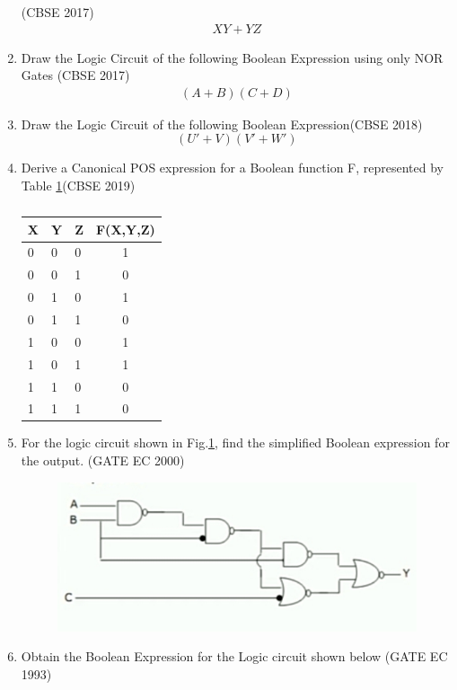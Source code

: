 \begin{enumerate}
\hfill (CBSE 2017)
\label{prob:2017-1/c/6/b}
\begin{align}
	\label{eq:2017-1/c/6/b}
	XY + YZ
\end{align}
\item Draw the Logic Circuit of the following Boolean Expression using only NOR Gates
\hfill (CBSE 2017)
\label{prob:2017/c/6/b}
\begin{align}
	(A+B)(C+D)
\end{align}
\item Draw the Logic Circuit of the following Boolean Expression\hfill (CBSE 2018)
\begin{equation}
	(U'+V)(V'+W')
\end{equation}
\label{prob:2018/c/6/b}
\item Derive a Canonical POS expression for a Boolean function F, represented by
Table \ref{tab:2019/c/6/c}\hfill (CBSE 2019)
\label{prob:2019/c/6/c}
\begin{table}[H]
	\centering
	\begin{tabular}{|l|l|l|c|}
		\hline
		X & Y & Z & F(X,Y,Z) \\
		\hline
		0 & 0 & 0 & 1        \\
		0 & 0 & 1 & 0        \\
		0 & 1 & 0 & 1        \\
		0 & 1 & 1 & 0        \\
		1 & 0 & 0 & 1        \\
		1 & 0 & 1 & 1        \\
		1 & 1 & 0 & 0        \\
		1 & 1 & 1 & 0        \\
		\hline
	\end{tabular}
	\caption{}
	\label{tab:2019/c/6/c}
\end{table}
\item For the logic circuit shown in Fig.\ref{fig:2000/gate/ec/2/7}, find the simplified Boolean expression for the output.
\label{prob:2000/gate/ec/2/7}
\hfill (GATE EC 2000)
\begin{figure}[H]
	\centering
	\includegraphics[width=\columnwidth]{figs/2000-gate-ec-2-7.jpg}
	\caption{}
	\label{fig:2000/gate/ec/2/7}
\end{figure}
\item
Obtain the Boolean Expression for the Logic circuit shown below
\label{prob:1993/gate/ec/4/8}
\hfill (GATE EC 1993)


\end{enumerate}
